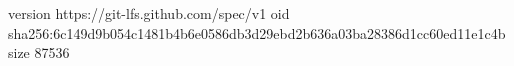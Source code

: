 version https://git-lfs.github.com/spec/v1
oid sha256:6c149d9b054c1481b4b6e0586db3d29ebd2b636a03ba28386d1cc60ed11e1c4b
size 87536
